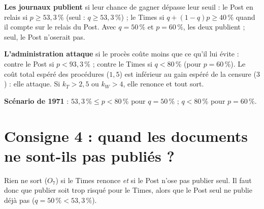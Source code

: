 \documentclass[11pt,a4paper]{article}
\theoremstyle{definition}
\begin{document}
\begin{reponse}
\textbf{Les journaux publient} si leur chance de gagner dépasse leur seuil : le Post en relais si $p\ge53{,}3\,\%$ (seul : $q\ge53{,}3\,\%$) ; le Times si $q+(1-q)p\ge40\,\%$ quand il compte sur le relais du Post. Avec $q=50\,\%$ et $p=60\,\%$, les deux publient ; seul, le Post n'oserait pas.

\textbf{L'administration attaque} si le procès coûte moins que ce qu'il lui évite : contre le Post si $p<93{,}3\,\%$ ; contre le Times si $q<80\,\%$ (pour $p=60\,\%$). Le coût total espéré des procédures ($1{,}5$) est inférieur au gain espéré de la censure ($3$) : elle attaque. Si $k_T>2{,}5$ ou $k_W>4$, elle renonce et tout sort.

\textbf{Scénario de 1971} : $53{,}3\,\%\le p<80\,\%$ pour $q=50\,\%$ ; $q<80\,\%$ pour $p=60\,\%$.
\end{reponse}

\section{Consigne 4 : quand les documents ne sont-ils pas publiés ?}

Rien ne sort ($O_7$) si le Times renonce \emph{et} si le Post n'ose pas publier seul. Il faut donc que publier soit trop risqué pour le Times, alors que le Post seul ne publie déjà pas ($q=50\,\%<53{,}3\,\%$).
\end{document}
